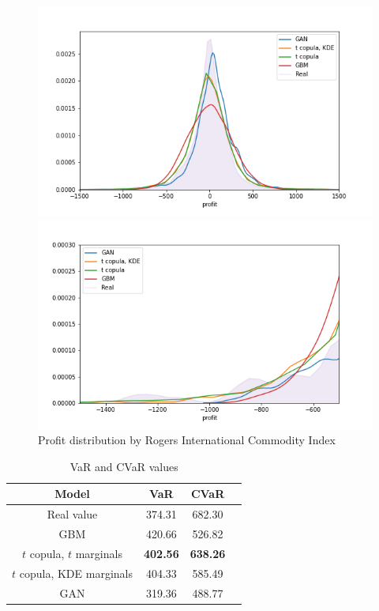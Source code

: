 \documentclass{article}
\begin{document}
\begin{figure}[h]
    \centering
    \begin{minipage}{.5\linewidth}
        \centering
        \includegraphics[width=\textwidth]{pics/hists.png}
    \end{minipage}%
    \begin{minipage}{.5\linewidth}
        \centering
        \includegraphics[width=\textwidth]{pics/tails.png}
    \end{minipage}%
    \caption{Profit distribution by Rogers International Commodity Index}
    \label{fig:profit}
\end{figure}

\begin{table}[h]
    \begin{center}
    \begin{tabular}{ |c|c|c|c| } 
    \hline
    Model & VaR & CVaR \\ 
    \hline
    Real value & 374.31 & 682.30 \\ 
    \hline
    GBM & 420.66 & 526.82 \\ 
    $t$ copula, $t$ marginals & \textbf{402.56} & \textbf{638.26} \\ 
    $t$ copula, KDE marginals & 404.33 & 585.49 \\ 
    GAN & 319.36 & 488.77 \\ 
    \hline
    \end{tabular}
    \end{center}
    \caption{VaR and CVaR values}
    \label{tab:var}
\end{table}
\end{document}
